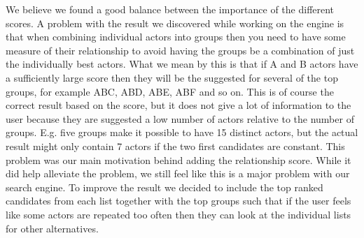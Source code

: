 We believe we found a good balance between the importance of the different scores. A problem with the result we discovered while working on the engine is that when combining individual actors into groups then you need to have some measure of their relationship to avoid having the groups be a combination of just the individually best actors. What we mean by this is that if A and B actors have a sufficiently large score then they will be the suggested for several of the top groups, for example ABC, ABD, ABE, ABF and so on. This is of course the correct result based on the score, but it does not give a lot of information to the user because they are suggested a low number of actors relative to the number of groups. E.g. five groups make it possible to have 15 distinct actors, but the actual result might only contain 7 actors if the two first candidates are constant. This problem was our main motivation behind adding the relationship score. While it did help alleviate the problem, we still feel like this is a major problem with our search engine. To improve the result we decided to include the top ranked candidates from each list together with the top groups such that if the user feels like some actors are repeated too often then they can look at the individual lists for other alternatives.
